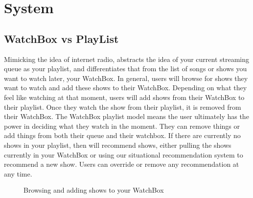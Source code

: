 \section{System}

\subsection{WatchBox vs PlayList}
Mimicking the idea of internet radio, {\sys} abstracts the idea of
your current streaming queue as your playlist, and differentiates that
from the list of songs or shows you want to watch later, your
WatchBox.  In general, users will browse for shows they want to watch
and add these shows to their WatchBox.  Depending on what they feel
like watching at that moment, users will add shows from their WatchBox
to their playlist.  Once they watch the show from their playlist, it
is removed from their WatchBox.  The WatchBox playlist model means the
user ultimately has the power in deciding what they watch in the
moment.  They can remove things or add things from both their queue
and their watchbox.  If there are currently no shows in your playlist,
then {\sys} will recommend shows, either pulling the shows currently
in your WatchBox or using our situational recommendation system to
recommend a new show.  Users can override or remove any recommendation
at any time.


\begin{figure} [hb]
\centering
{}

\caption{Browsing and adding shows to your WatchBox}
\label{fig:watchbox}
\end{figure}

